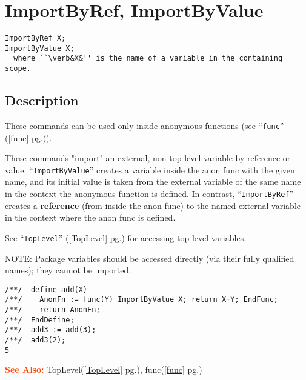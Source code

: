 \documentclass[a4paper]{mybook}
\newenvironment{command}{}{} %
\newcommand\SeeAlso{\par\textcolor{OrangeRed}{\textbf{\large See Also: }}}
\begin{document}
\section{ImportByRef, ImportByValue}
\label{ImportByRef, ImportByValue}
\begin{command} %


\begin{Verbatim}[label=syntax, rulecolor=\color{MidnightBlue},
frame=single]
ImportByRef X;
ImportByValue X;
  where ``\verb&X&'' is the name of a variable in the containing scope.
\end{Verbatim}


\subsection*{Description}

These commands can be used only inside anonymous functions (see ``\verb&func&'' (\ref{func} pg.\pageref{func})).
\par 
These commands "import" an external, non-top-level variable by reference
or value.  ``\verb&ImportByValue&'' creates a variable inside the anon func with
the given name, and its initial value is taken from the external variable
of the same name in the context the anonymous function is defined.  In
contrast, ``\verb&ImportByRef&'' creates a \textbf{reference} (from inside the anon
func) to the named external variable in the context where the anon func
is defined.
\par 
See ``\verb&TopLevel&'' (\ref{TopLevel} pg.\pageref{TopLevel}) for accessing top-level variables.
\par 
NOTE: Package variables should be accessed directly (via their fully
qualified names); they cannot be imported.
\begin{Verbatim}[label=example, rulecolor=\color{PineGreen}, frame=single]
/**/  define add(X)
/**/    AnonFn := func(Y) ImportByValue X; return X+Y; EndFunc;
/**/    return AnonFn;
/**/  EndDefine;
/**/  add3 := add(3);
/**/  add3(2);
5
\end{Verbatim}


\SeeAlso %
  TopLevel(\ref{TopLevel} pg.\pageref{TopLevel}), 
    func(\ref{func} pg.\pageref{func})
\end{command} %
\end{document}
